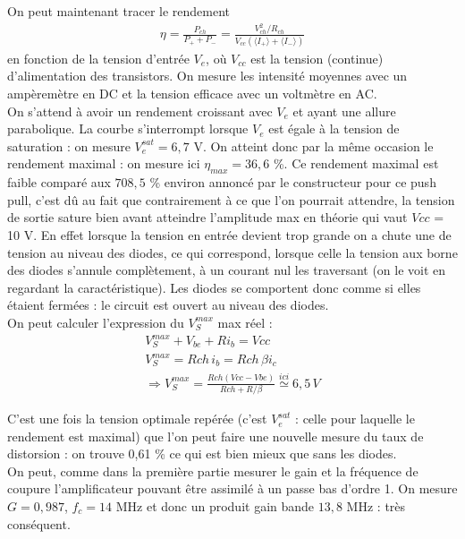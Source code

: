 \documentclass[12pt,prb,aps,epsf]{article}
\begin{document}
On peut maintenant tracer le rendement
\begin{eqnarray}
\eta = \frac{P_{ch}}{P_+ + P_-} = \frac{V_{ch}^2/R_{ch}}{V_{cc}(\langle I_+ \rangle + \langle I_- \rangle)}
\end{eqnarray}
en fonction de la tension d'entrée $V_e$, où $V_{cc}$ est la tension (continue) d'alimentation des transistors. On mesure les intensité moyennes avec un ampèremètre en DC et la tension efficace avec un voltmètre en AC.\\ 
On s'attend à avoir un rendement croissant avec $V_e$ et ayant une allure parabolique. La courbe s'interrompt lorsque $V_e$ est égale à la tension de saturation : on mesure $V_e^{sat} = 6,7$ V. On atteint donc par la même occasion le rendement maximal : on mesure ici $\eta_{max} = 36,6$ \%. Ce rendement maximal est faible comparé aux $708,5$ \% environ annoncé par le constructeur pour ce push pull, c'est dû au fait que contrairement à ce que l'on pourrait attendre, la tension de sortie sature bien avant atteindre l'amplitude max en théorie qui vaut $Vcc$ = 10 V. En effet lorsque la tension en entrée devient trop grande on a chute une de tension au niveau des diodes, ce qui correspond, lorsque celle la tension aux borne des diodes s'annule complètement, à un courant nul les traversant (on le voit en regardant la caractéristique). Les diodes se comportent donc comme si elles étaient fermées : le circuit est ouvert au niveau des diodes.\\ 
On peut calculer l'expression du $V_S^{max}$ max réel :
\begin{eqnarray}
V_S^{max} + V_{be} + Ri_b = Vcc\\
V_S^{max} = Rch\, i_b = Rch\,\beta i_c\\
\Longrightarrow V_S^{max} = \frac{Rch (Vcc-Vbe)}{Rch + R/\beta} \stackrel{ici}{\simeq} 6,5\,V
\end{eqnarray}

C'est une fois la tension optimale repérée (c'est $V_e^{sat}$ : celle pour laquelle le rendement est maximal) que l'on peut faire une nouvelle mesure du taux de distorsion : on trouve 0,61 \% ce qui est bien mieux que sans les diodes.\\

On peut, comme dans la première partie mesurer le gain et la fréquence de coupure l'amplificateur pouvant être assimilé à un passe bas d'ordre 1. On mesure $G = 0,987$, $f_c = 14$ MHz et donc un produit gain bande $13,8$ MHz : très conséquent.\\
\end{document}
